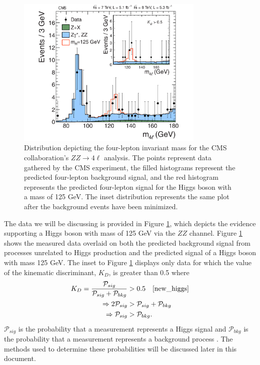 \documentclass[12pt]{article}
\begin{document}
\begin{figure}[h!]
\centering
\includegraphics[width=0.8\textwidth]{images/HtoZZ}
\caption{Distribution depicting the four-lepton invariant mass for the CMS collaboration's $ZZ \to 4 \ell$ analysis. The points represent data gathered by the CMS experiment, the filled histograms represent the predicted four-lepton background signal, and the red histogram represents the predicted four-lepton signal for the Higgs boson with a mass of 125 GeV. The inset distribution represents the same plot after the background events have been minimized.}
\label{HtoZZ}
\end{figure}
\noindent
The data we will be discussing is provided in Figure \ref{HtoZZ}, which depicts the evidence supporting a Higgs boson with mass of 125 GeV via the $ZZ$ channel. Figure \ref{HtoZZ} shows the measured data overlaid on both the predicted background signal from processes unrelated to Higgs production and the predicted signal of a Higgs boson with mass 125 GeV. The inset to Figure \ref{HtoZZ} displays only data for which the value of the kinematic discriminant, $K_D$, is greater than 0.5 where
\begin{align*}
K_D = \frac{\mathcal{P}_{sig}}{\mathcal{P}_{sig} + \mathcal{P}_{bkg}}  &> 0.5 \quad \cite{new_higgs}\\
\Rightarrow 2\mathcal{P}_{sig} &> \mathcal{P}_{sig} + \mathcal{P}_{bkg} \\
\Rightarrow \mathcal{P}_{sig} &> \mathcal{P}_{bkg}.
\end{align*}
$\mathcal{P}_{sig}$ is the probability that a measurement represents a Higgs signal and $\mathcal{P}_{bkg}$ is the probability that a measurement represents a background process \cite{recent_results}. The methods used to determine these probabilities will be discussed later in this document.
\end{document}
